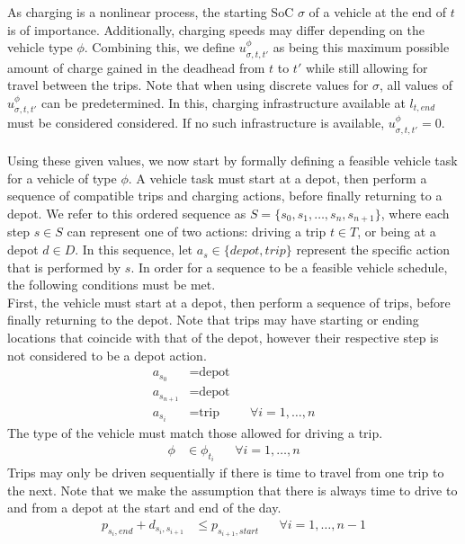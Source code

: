 \documentclass[]{article}
\begin{document}
As charging is a nonlinear process, the starting SoC $\sigma$ of a vehicle at the end of $t$ is of importance. Additionally, charging speeds may differ depending on the vehicle type $\phi$. Combining this, we define $u^\phi_{\sigma,t,t'}$ as being this maximum possible amount of charge gained in the deadhead from $t$ to $t'$ while still allowing for travel between the trips. Note that when using discrete values for $\sigma$, all values of $u^\phi_{\sigma,t, t'}$ can be predetermined. In this, charging infrastructure available at $l_{t,end}$ must be considered considered. If no such infrastructure is available, $u^\phi_{\sigma,t, t'} = 0$. \\\\
Using these given values, we now start by formally defining a feasible vehicle task for a vehicle of type $\phi$. A vehicle task must start at a depot, then perform a sequence of compatible trips and charging actions, before finally returning to a depot. We refer to this ordered sequence as $S = \{ s_0, s_1, \dots, s_n, s_{n+1} \}$, where each step $s \in S$ can represent one of two actions: driving a trip $t \in T$, or being at a depot $d \in D$. In this sequence, let $a_s \in \{ depot, trip \}$ represent the specific action that is performed by $s$. In order for a sequence to be a feasible vehicle schedule, the following conditions must be met. \\
First, the vehicle must start at a depot, then perform a sequence of trips, before finally returning to the depot. Note that trips may have starting or ending locations that coincide with that of the depot, however their respective step is not considered to be a depot action.
\begin{align}
  a_{s_0} &= \text{depot} && \\
  a_{s_{n+1}} &= \text{depot} && \\ 
  a_{s_i} &= \text{trip} && \forall i = 1, \dots, n
\end{align}
The type of the vehicle must match those allowed for driving a trip. 
\begin{align}
  \phi &\in \phi_{t_i} && \forall i = 1, \dots, n
\end{align}
Trips may only be driven sequentially if there is time to travel from one trip to the next. Note that we make the assumption that there is always time to drive to and from a depot at the start and end of the day. 
\begin{align}
  p_{s_i,end} + d_{s_i, s_{i+1}} &\leq p_{s_{i+1},start} && \forall i = 1, \dots, n-1
\end{align}
\end{document}
